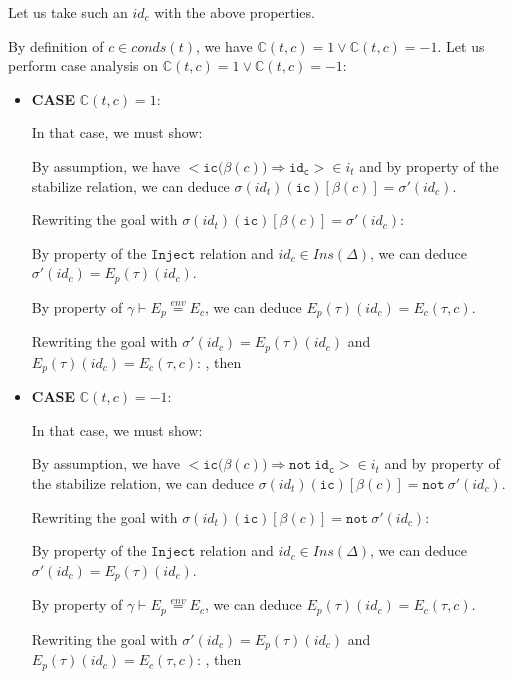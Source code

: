 \documentclass[dvipsnames,12pt]{article}
\begin{document}
\begin{niproof}
\begin{itemize}
    Let us take such an $id_c$ with the above properties.

    By definition of $c\in{}conds(t)$, we have
    $\mathbb{C}(t,c)=1\lor\mathbb{C}(t,c)=-1$. Let us perform case
    analysis on $\mathbb{C}(t,c)=1\lor\mathbb{C}(t,c)=-1$:

    \begin{itemize}
    \item \textbf{CASE} $\mathbb{C}(t,c)=1$:

      In that case, we must show:

      By assumption, we have
      ${<}\mathtt{ic(}\beta(c)\mathtt{)\Rightarrow{}id_c}{>}\in{}i_t$
      and by property of the stabilize relation, we can deduce
      $\sigma(id_t)(\texttt{ic})[\beta(c)]=\sigma'(id_c)$.

      Rewriting the goal with
      $\sigma(id_t)(\texttt{ic})[\beta(c)]=\sigma'(id_c)$:


      By property of the $\mathtt{Inject}$ relation and
      $id_c\in{}Ins(\Delta)$, we can deduce
      $\sigma'(id_c)=E_p(\tau)(id_c)$.

      By property of $\gamma\vdash{}E_p\stackrel{env}{=}E_c$, we can
      deduce $E_p(\tau)(id_c)=E_c(\tau,c)$.

      Rewriting the goal with $\sigma'(id_c)=E_p(\tau)(id_c)$ and
      $E_p(\tau)(id_c)=E_c(\tau,c)$:
      , then 

    \item \textbf{CASE} $\mathbb{C}(t,c)=-1$:

      In that case, we must show:

      By assumption, we have
      ${<}\mathtt{ic(}\beta(c)\mathtt{)\Rightarrow{}not~id_c}{>}\in{}i_t$
      and by property of the stabilize relation, we can deduce
      $\sigma(id_t)(\texttt{ic})[\beta(c)]=\mathtt{not}~\sigma'(id_c)$.

      Rewriting the goal with
      $\sigma(id_t)(\texttt{ic})[\beta(c)]=\mathtt{not}~\sigma'(id_c)$:


      By property of the $\mathtt{Inject}$ relation and
      $id_c\in{}Ins(\Delta)$, we can deduce
      $\sigma'(id_c)=E_p(\tau)(id_c)$.

      By property of $\gamma\vdash{}E_p\stackrel{env}{=}E_c$, we can
      deduce $E_p(\tau)(id_c)=E_c(\tau,c)$.

      Rewriting the goal with $\sigma'(id_c)=E_p(\tau)(id_c)$ and
      $E_p(\tau)(id_c)=E_c(\tau,c)$:
      , then
      
    \end{itemize}
    
  \end{itemize}
  
\end{niproof}
\end{document}
